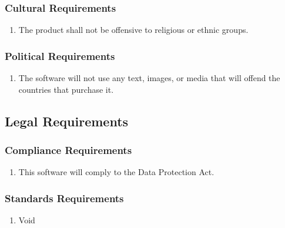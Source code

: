 \documentclass[]{article}
\begin{document}
\subsubsection{Cultural Requirements}
\label{ssub:cultural_requirements}
\begin{enumerate}[{CP}1. ]
	\item The product shall not be offensive to religious or ethnic groups. 
\end{enumerate}

\subsubsection{Political Requirements}
\label{ssub:political_requirements}
\begin{enumerate}[{CP}1. ]
	\item The software will not use any text, images, or media that will offend the countries that purchase it.

\end{enumerate}


\subsection{Legal Requirements}
\label{sub:legal_requirements}

\subsubsection{Compliance Requirements}
\label{ssub:compliance_requirements}
\begin{enumerate}[{LR}1. ]
	\item  This software will comply to the Data Protection Act.
\end{enumerate}

\subsubsection{Standards Requirements}
\label{ssub:standards_requirements}
\begin{enumerate}[{LR}1. ]
	\item Void
\end{enumerate}

\end{document}
